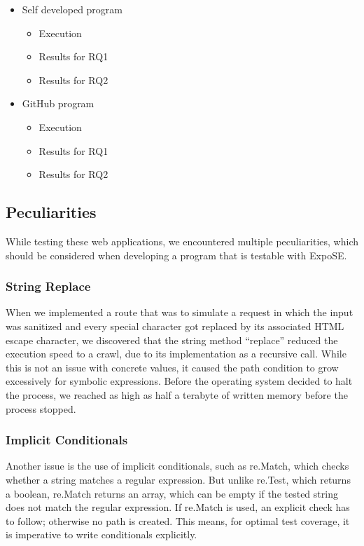 \begin{itemize}
    \item Self developed program
    \begin{itemize}
        \item Execution
        \item Results for RQ1
        \item Results for RQ2
    \end{itemize}
    \item GitHub program
    \begin{itemize}
        \item Execution
        \item Results for RQ1
        \item Results for RQ2
    \end{itemize}
\end{itemize}

\subsection{Peculiarities}
\label{sec:peculiarities}
While testing these web applications, we encountered multiple peculiarities, which should be considered when developing a program that is testable with ExpoSE.

\subsubsection{String Replace}
When we implemented a route that was to simulate a request in which the input was sanitized and every special character got replaced by its associated HTML escape character, we discovered that the string method “replace” reduced the execution speed to a crawl, due to its implementation as a recursive call.
While this is not an issue with concrete values, it caused the path condition to grow excessively for symbolic expressions. Before the operating system decided to halt the process, we reached as high as half a terabyte of written memory before the process stopped.


\subsubsection{Implicit Conditionals}
Another issue is the use of implicit conditionals, such as re.Match, which checks whether a string matches a regular expression. But unlike re.Test, which returns a boolean, re.Match returns an array, which can be empty if the tested string does not match the regular expression. 
If re.Match is used, an explicit check has to follow; otherwise no path is created. 
This means, for optimal test coverage, it is imperative to write conditionals explicitly. 

